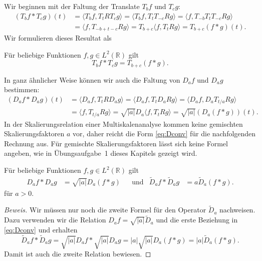 Wir beginnen mit der Faltung der Translate $T_bf$ und $T_cg$:
\begin{align*}
(T_bf * T_cg)(t)
&=
\langle T_bf, T_tRT_cg\rangle
=
\langle T_bf, T_tT_{-c}Rg\rangle
=
\langle f, T_{-b}T_tT_{-c}Rg\rangle
\\
&=
\langle f, T_{-b+t-c}Rg\rangle
=
T_{b+c}
\langle f, T_tRg\rangle
=
T_{b+c}(f*g)(t).
\end{align*}
Wir formulieren dieses Resultat als

\begin{satz}
Für beliebige Funktionen $f,g\in L^2(\mathbb R)$ gilt
\begin{equation}
T_bf*T_cg
=
T_{b+c}(f*g).
\label{eq:Tconv}
\end{equation}
\end{satz}

In ganz ähnlicher Weise können wir auch die Faltung von
$D_af$ und $D_ag$ bestimmen:
\begin{align*}
(D_af * D_ag)(t)
&=
\langle D_af, T_tRD_ag\rangle
=
\langle D_af, T_tD_aRg\rangle
=
\langle D_af, D_aT_{t/a}Rg\rangle
\\
&=
\langle f, T_{t/a}Rg\rangle
=
\sqrt{|a|} D_a \langle f, T_t Rg\rangle
=
\sqrt{|a|}(D_a (f*g))(t).
\end{align*}
In der Skalierungsrelation einer Multiskalenanalyse kommen keine
gemischten Skalierungsfaktoren $a$ vor, daher reicht die Form
\eqref{eq:Dconv} für die nachfolgenden Rechnung aus.
Für gemischte Skalierungsfaktoren lässt sich keine Formel angeben,
wie in Übungsaufgabe~1 dieses Kapitels gezeigt wird.

\begin{satz}
\label{satz:faltung:Da}
Für beliebige Funktionen $f,g\in L^2(\mathbb R)$ gilt
\begin{align}
D_af * D_ag &= \sqrt{|a|}D_a(f*g)
&&\text{und}
&
\tilde{D}_af * \tilde{D}_ag &= a\tilde{D}_a(f*g).
\label{eq:Dconv}
\end{align}
für $a>0$.
\end{satz}

\begin{proof}[Beweis]
Wir müssen nur noch die zweite Formel für den Operator $\tilde{D}_a$
nachweisen.
Dazu verwenden wir die Relation $D_af = \sqrt{|a|}\tilde{D}_a$ und die
erste Beziehung in \eqref{eq:Dconv} und erhalten
\[
\tilde{D}_af * \tilde{D}_ag
=
\sqrt{|a|}D_af * \sqrt{|a|}D_ag
=
|a|
\sqrt{|a|}
D_a (f*g)
=
|a|
\tilde{D}_a(f*g).
\]
Damit ist auch die zweite Relation bewiesen.
\end{proof}


